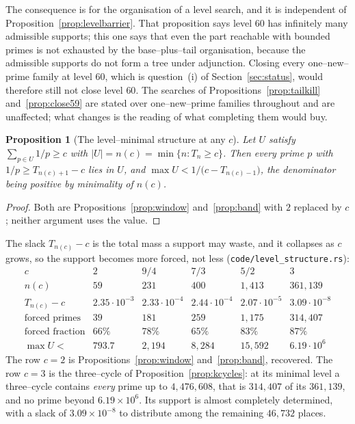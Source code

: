 \documentclass[11pt]{article}
\newtheorem{proposition}[theorem]{Proposition}
\theoremstyle{definition}
\begin{document}
The consequence is for the organisation of a level search, and it is independent of
Proposition~\ref{prop:levelbarrier}. That proposition says level $60$ has infinitely many admissible
supports; this one says that even the part reachable with bounded primes is not exhausted by the
base--plus--tail organisation, because the admissible supports do not form a tree under adjunction.
Closing every one--new--prime family at level $60$, which is question~(i) of
Section~\ref{sec:status}, would therefore still not close level $60$. The searches of
Propositions~\ref{prop:tailkill} and~\ref{prop:close59} are stated over one--new--prime families
throughout and are unaffected; what changes is the reading of what completing them would buy.

\begin{proposition}[The level--minimal structure at any $c$]\label{prop:levelstructure}
Let $U$ satisfy $\sum_{p\in U}1/p\ge c$ with $|U|=n(c)=\min\{n:T_n\ge c\}$. Then every prime $p$ with
$1/p\ge T_{n(c)+1}-c$ lies in $U$, and $\max U<1/\bigl(c-T_{n(c)-1}\bigr)$, the denominator being
positive by minimality of $n(c)$.
\end{proposition}
\begin{proof}
Both are Propositions~\ref{prop:window} and~\ref{prop:band} with $2$ replaced by $c$; neither
argument uses the value.
\end{proof}

The slack $T_{n(c)}-c$ is the total mass a support may waste, and it collapses as $c$ grows, so the
support becomes more forced, not less \textup{(\texttt{code/level\_structure.rs})}:
\[
\begin{array}{l|ccccc}
c & 2 & 9/4 & 7/3 & 5/2 & 3\\\hline
n(c) & 59 & 231 & 400 & 1{,}413 & 361{,}139\\
T_{n(c)}-c & 2.35\!\cdot\!10^{-3} & 2.33\!\cdot\!10^{-4} & 2.44\!\cdot\!10^{-4} &
  2.07\!\cdot\!10^{-5} & 3.09\!\cdot\!10^{-8}\\
\text{forced primes} & 39 & 181 & 259 & 1{,}175 & 314{,}407\\
\text{forced fraction} & 66\% & 78\% & 65\% & 83\% & 87\%\\
\max U< & 793.7 & 2{,}194 & 8{,}284 & 15{,}592 & 6.19\!\cdot\!10^{6}
\end{array}
\]
The row $c=2$ is Propositions~\ref{prop:window} and~\ref{prop:band}, recovered. The row $c=3$ is the
three--cycle of Proposition~\ref{prop:kcycles}: at its minimal level a three--cycle contains
\emph{every} prime up to $4{,}476{,}608$, that is $314{,}407$ of its $361{,}139$, and no prime beyond
$6.19\times10^{6}$. Its support is almost completely determined, with a slack of $3.09\times10^{-8}$
to distribute among the remaining $46{,}732$ places.
\end{document}
